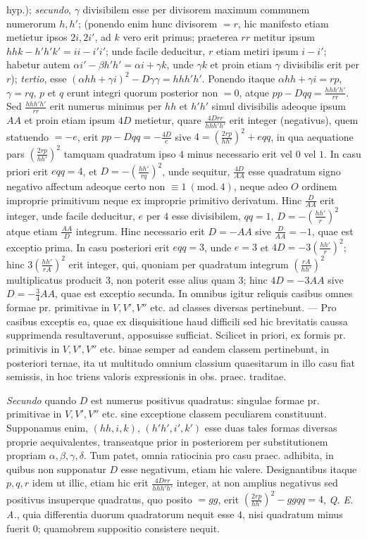 hyp.); \textit{secundo}, \(\gamma\) divisibilem esse per divisorem maximum communem numerorum \(h,h'\); (ponendo enim hunc divisorem \(=r\), hic manifesto etiam metietur ipsos \(2i,2i'\), ad \(k\) vero erit primus; praeterea \(rr\) metitur ipsum \(hhk-h'h'k'=ii-i'i'\); unde facile deducitur, \(r\) etiam metiri ipsum \(i-i'\); habetur autem \(\alpha i'-\beta h'h'=\alpha i+\gamma k\), unde \(\gamma k\) et proin etiam \(\gamma\) divisibilis erit per \(r\)); \textit{tertio}, esse \((\alpha hh+\gamma i)^2-D\gamma\gamma=hhh'h'\). Ponendo itaque \(\alpha hh+\gamma i=rp\), \(\gamma=rq\), \(p\) et \(q\) erunt integri quorum posterior non \(=0\), atque \(pp-Dqq=\frac{hhh'h'}{rr}\). Sed \(\frac{hhh'h'}{rr}\) erit numerus minimus per \(hh\) et \(h'h'\) simul divisibilis adeoque ipsum \(AA\) et proin etiam ipsum \(4D\) metietur, quare \(\frac{4Drr}{hhh'h'}\) erit integer (negativus), quem statuendo \(=-e\), erit \(pp-Dqq=-\frac{4D}{e}\) sive \(4=(\frac{2rp}{hh'})^2+eqq\), in qua aequatione pars \((\frac{2rp}{hh'})^2\) tamquam quadratum ipso \(4\) minus necessario erit vel \(0\) vel \(1\). In casu priori erit \(eqq=4\), et \(D=-(\frac{hh'}{rq})^2\), unde sequitur, \(\frac{4D}{AA}\) esse quadratum signo negativo affectum adeoque certo non \(\equiv1\ (\mathrm{mod.}\,4)\), neque adeo \(O\) ordinem improprie primitivum neque ex improprie primitivo derivatum. Hinc \(\frac{D}{AA}\) erit integer, unde facile deducitur, \(e\) per \(4\) esse divisibilem, \(qq=1\), \(D=-(\frac{hh'}{r})^2\) atque etiam \(\frac{AA}{D}\) integrum. Hinc necessario erit \(D=-AA\) sive \(\frac{D}{AA}=-1\), quae est exceptio prima. In casu posteriori erit \(eqq=3\), unde \(e=3\) et \(4D=-3(\frac{hh'}{r})^2\); hinc \(3(\frac{hh'}{rA})^2\) erit integer, qui, quoniam per quadratum integrum \((\frac{rA}{hh'})^2\) multiplicatus producit \(3\), non poterit esse alius quam \(3\); hinc \(4D=-3AA\) sive \(D=-\frac34 AA\), quae est exceptio secunda. In omnibus igitur reliquis casibus omnes formae pr. primitivae in \(V,V',V''\) etc. ad classes diversas pertinebunt. --- Pro casibus exceptis ea, quae ex disquisitione haud difficili sed hic brevitatis caussa supprimenda resultaverunt, apposuisse sufficiat. Scilicet in priori, ex formis pr. primitivis in \(V,V',V''\) etc. binae semper ad eandem classem pertinebunt, in posteriori ternae, ita ut multitudo omnium classium quaesitarum in illo casu fiat semissis, in hoc triens valoris expressionis in obs. praec. traditae.

\textit{Secundo} quando \(D\) est numerus positivus quadratus: singulae formae pr. primitivae in \(V,V',V''\) etc. sine exceptione classem peculiarem constituunt. Supponamus enim, \((hh,i,k)\), \((h'h',i',k')\) esse duas tales formas diversas proprie aequivalentes, transeatque prior in posteriorem per substitutionem propriam \(\alpha,\beta,\gamma,\delta\). Tum patet, omnia ratiocinia pro casu praec. adhibita, in quibus non supponatur \(D\) esse negativum, etiam hic valere. Designantibus itaque \(p,q,r\)
idem ut illic, etiam hic erit \(\frac{4Drr}{hhh'h'}\) integer, at non amplius negativus sed positivus insuperque quadratus, quo posito \(=gg\), erit \((\frac{2rp}{hh'})^2-ggqq=4\), \textit{Q. E. A.}, quia differentia duorum quadratorum nequit esse \(4\), nisi quadratum minus fuerit \(0\); quamobrem suppositio consistere nequit.

